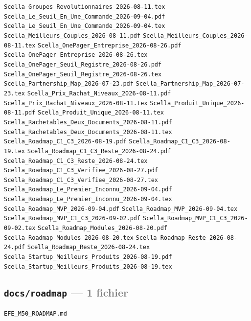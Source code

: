 \documentclass[10pt]{report}
\newcommand{\code}[1]{\texttt{\small #1}}
\begin{document}
\begin{sloppypar}
\code{Scella\_Groupes\_Revolutionnaires\_2026-08-11.tex} \;\textbullet\; \code{Scella\_Le\_Seuil\_En\_Une\_Commande\_2026-09-04.pdf} \;\textbullet\; \code{Scella\_Le\_Seuil\_En\_Une\_Commande\_2026-09-04.tex} \;\textbullet\; \code{Scella\_Meilleurs\_Couples\_2026-08-11.pdf} \;\textbullet\; \code{Scella\_Meilleurs\_Couples\_2026-08-11.tex} \;\textbullet\; \code{Scella\_OnePager\_Entreprise\_2026-08-26.pdf} \;\textbullet\; \code{Scella\_OnePager\_Entreprise\_2026-08-26.tex} \;\textbullet\; \code{Scella\_OnePager\_Seuil\_Registre\_2026-08-26.pdf} \;\textbullet\; \code{Scella\_OnePager\_Seuil\_Registre\_2026-08-26.tex} \;\textbullet\; \code{Scella\_Partnership\_Map\_2026-07-23.pdf} \;\textbullet\; \code{Scella\_Partnership\_Map\_2026-07-23.tex} \;\textbullet\; \code{Scella\_Prix\_Rachat\_Niveaux\_2026-08-11.pdf} \;\textbullet\; \code{Scella\_Prix\_Rachat\_Niveaux\_2026-08-11.tex} \;\textbullet\; \code{Scella\_Produit\_Unique\_2026-08-11.pdf} \;\textbullet\; \code{Scella\_Produit\_Unique\_2026-08-11.tex} \;\textbullet\; \code{Scella\_Rachetables\_Deux\_Documents\_2026-08-11.pdf} \;\textbullet\; \code{Scella\_Rachetables\_Deux\_Documents\_2026-08-11.tex} \;\textbullet\; \code{Scella\_Roadmap\_C1\_C3\_2026-08-19.pdf} \;\textbullet\; \code{Scella\_Roadmap\_C1\_C3\_2026-08-19.tex} \;\textbullet\; \code{Scella\_Roadmap\_C1\_C3\_Reste\_2026-08-24.pdf} \;\textbullet\; \code{Scella\_Roadmap\_C1\_C3\_Reste\_2026-08-24.tex} \;\textbullet\; \code{Scella\_Roadmap\_C1\_C3\_Verifiee\_2026-08-27.pdf} \;\textbullet\; \code{Scella\_Roadmap\_C1\_C3\_Verifiee\_2026-08-27.tex} \;\textbullet\; \code{Scella\_Roadmap\_Le\_Premier\_Inconnu\_2026-09-04.pdf} \;\textbullet\; \code{Scella\_Roadmap\_Le\_Premier\_Inconnu\_2026-09-04.tex} \;\textbullet\; \code{Scella\_Roadmap\_MVP\_2026-09-04.pdf} \;\textbullet\; \code{Scella\_Roadmap\_MVP\_2026-09-04.tex} \;\textbullet\; \code{Scella\_Roadmap\_MVP\_C1\_C3\_2026-09-02.pdf} \;\textbullet\; \code{Scella\_Roadmap\_MVP\_C1\_C3\_2026-09-02.tex} \;\textbullet\; \code{Scella\_Roadmap\_Modules\_2026-08-20.pdf} \;\textbullet\; \code{Scella\_Roadmap\_Modules\_2026-08-20.tex} \;\textbullet\; \code{Scella\_Roadmap\_Reste\_2026-08-24.pdf} \;\textbullet\; \code{Scella\_Roadmap\_Reste\_2026-08-24.tex} \;\textbullet\; \code{Scella\_Startup\_Meilleurs\_Produits\_2026-08-19.pdf} \;\textbullet\; \code{Scella\_Startup\_Meilleurs\_Produits\_2026-08-19.tex}
\end{sloppypar}

\subsection*{\code{docs/roadmap} \normalfont\textcolor{grey}{--- 1 fichier}}
\begin{sloppypar}\footnotesize\raggedright
\code{EFE\_M50\_ROADMAP.md}
\end{sloppypar}
\end{document}
